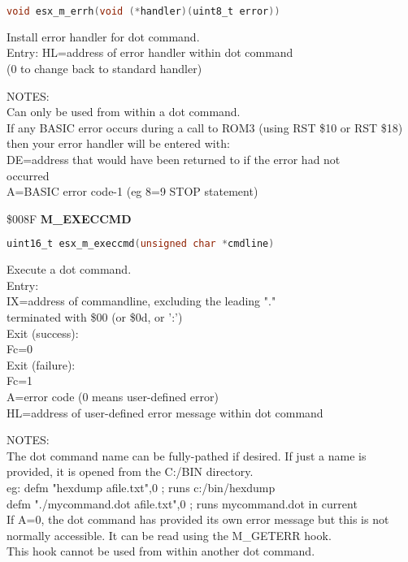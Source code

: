 \begin{lstlisting}[language=C]
void esx_m_errh(void (*handler)(uint8_t error))
\end{lstlisting}

Install error handler for dot command.\\
Entry: HL=address of error handler within dot command\\
(0 to change back to standard handler)

NOTES:\\
Can only be used from within a dot command.\\
If any BASIC error occurs during a call to ROM3 (using RST \$10 or RST \$18)\\
then your error handler will be entered with:\\
DE=address that would have been returned to if the error had not\\
occurred\\
A=BASIC error code-1 (eg 8=9 STOP statement)

\$008F \textbf{M\_EXECCMD}

\begin{lstlisting}[language=C]
uint16_t esx_m_execcmd(unsigned char *cmdline)
\end{lstlisting}

Execute a dot command.\\
Entry:\\
IX=address of commandline, excluding the leading "."\\
terminated with \$00 (or \$0d, or ':')\\
Exit (success):\\
Fc=0\\
Exit (failure):\\
Fc=1\\
A=error code (0 means user-defined error)\\
HL=address of user-defined error message within dot command

NOTES:\\
The dot command name can be fully-pathed if desired. If just a name is\\
provided, it is opened from the C:/BIN directory.\\
eg: defm "hexdump afile.txt",0 ; runs c:/bin/hexdump\\
defm "./mycommand.dot afile.txt",0 ; runs mycommand.dot in current\\

If A=0, the dot command has provided its own error message but this is not\\
normally accessible. It can be read using the M\_GETERR hook.\\
This hook cannot be used from within another dot command.

